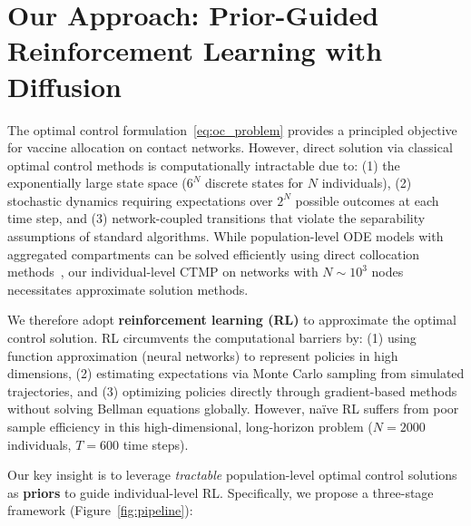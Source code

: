 \section{Our Approach: Prior-Guided Reinforcement Learning with Diffusion}
\label{sec:our_approach}

The optimal control formulation~\eqref{eq:oc_problem} provides a principled objective
for vaccine allocation on contact networks. However, direct solution via classical
optimal control methods is computationally intractable due to: (1) the exponentially
large state space ($6^N$ discrete states for $N$ individuals), (2) stochastic dynamics
requiring expectations over $2^N$ possible outcomes at each time step, and (3)
network-coupled transitions that violate the separability assumptions of standard
algorithms. While population-level ODE models with aggregated compartments can be
solved efficiently using direct collocation methods~\citep{师兄论文}, our individual-level
CTMP on networks with $N \sim 10^3$ nodes necessitates approximate solution methods.

We therefore adopt \textbf{reinforcement learning (RL)} to approximate the optimal
control solution. RL circumvents the computational barriers by: (1) using function
approximation (neural networks) to represent policies in high dimensions, (2) estimating
expectations via Monte Carlo sampling from simulated trajectories, and (3) optimizing
policies directly through gradient-based methods without solving Bellman equations
globally. However, naïve RL suffers from poor sample efficiency in this high-dimensional,
long-horizon problem ($N=2000$ individuals, $T=600$ time steps).

Our key insight is to leverage \emph{tractable} population-level optimal control
solutions as \textbf{priors} to guide individual-level RL. Specifically, we propose
a three-stage framework (Figure~\ref{fig:pipeline}):

